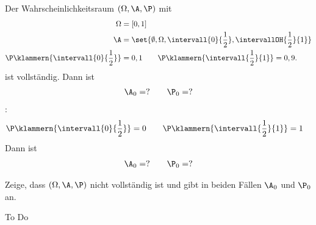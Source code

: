 \begin{beisp}
	Der Wahrscheinlichkeitsraum $(\Omega,\A,\P)$ mit
	\begin{align*}
		\Omega&=[0,1]\\
		\A&=\set{\emptyset,\Omega,\intervall{0}{\frac{1}{2}},\intervallOH{\frac{1}{2}}{1}}\\
		\P\klammern{\intervall{0}{\frac{1}{2}}}&=0,1\qquad\P\klammern{\intervall{\frac{1}{2}}{1}}=0,9.
	\end{align*}		
	ist  vollständig.
	 Dann ist
	 \begin{align*}
	 	\A_0=?\qquad\P_0=?
	 \end{align*}
	 :
	 \begin{align*}
	 	\P\klammern{\intervall{0}{\frac{1}{2}}}&=0\qquad\P\klammern{\intervall{\frac{1}{2}}{1}}=1
	 \end{align*}
	  Dann ist
	 \begin{align*}
	 	\A_0=?\qquad\P_0=?
	 \end{align*}

	\begin{aufgabe}[1.3.2.7]	 
	 	Zeige, dass $(\Omega,\A,\P)$ nicht vollständig ist und gibt in beiden Fällen $\A_0$ und $\P_0$ an.
	\end{aufgabe}
	\begin{lösung}
		To Do %
	\end{lösung}
\end{beisp}

